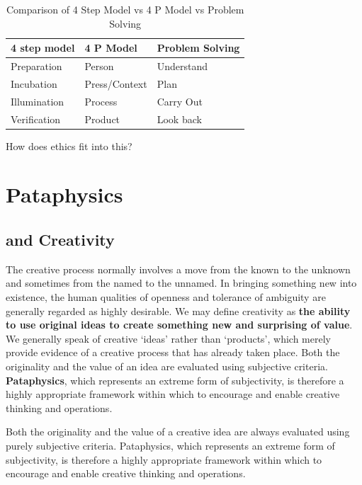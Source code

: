 \begin{table}[htbp]
\centering
\begin{tabular}{|l|l|l|}
\hline
\textbf{4 step model} & \textbf{4 P Model} & \textbf{Problem Solving} \\ \hline
Preparation   & Person         & Understand  \\ \hline
Incubation    & Press/Context  & Plan        \\ \hline
Illumination  & Process        & Carry Out   \\ \hline
Verification  & Product        & Look back   \\ \hline
\end{tabular}
\caption[4 Step Model vs 4 P Model vs Problem Solving]{Comparison of 4 Step Model vs 4 P Model vs Problem Solving}
\end{table}

\begin{fcom}
How does ethics fit into this?
\end{fcom}





\section{Pataphysics}


\subsection{and Creativity}

The creative process normally involves a move from the known to the unknown and sometimes from the named to the unnamed. In bringing something new into existence, the human qualities of openness and tolerance of ambiguity are generally regarded as highly desirable. We may define creativity as \textbf{the ability to use original ideas to create something new and surprising of value}. We generally speak of creative `ideas' rather than `products', which merely provide evidence of a creative process that has already taken place. Both the originality and the value of an idea are evaluated using subjective criteria. \textbf{Pataphysics}, which represents an extreme form of subjectivity, is therefore a highly appropriate framework within which to encourage and enable creative thinking and operations.

Both the originality and the value of a creative idea are always evaluated using purely subjective criteria. Pataphysics, which represents an extreme form of subjectivity, is therefore a highly appropriate framework within which to encourage and enable creative thinking and operations.

